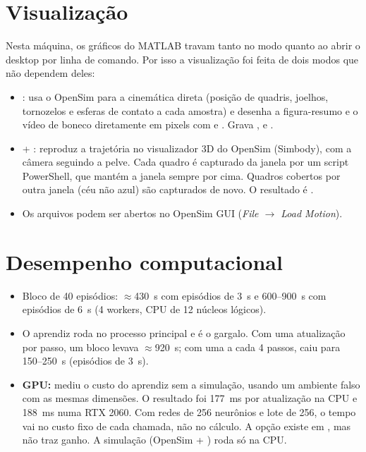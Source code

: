 \documentclass[11pt,a4paper]{article}
\begin{document}
\section{Visualização}
Nesta máquina, os gráficos do MATLAB travam tanto no modo  quanto ao abrir o desktop por linha
de comando. Por isso a visualização foi feita de dois modos que não dependem deles:
\begin{itemize}
  \item {}: usa o OpenSim para a cinemática direta (posição de quadris, joelhos,
        tornozelos e esferas de contato a cada amostra) e desenha a figura-resumo e o vídeo de boneco
        diretamente em pixels com  e . Grava ,
         e .
  \item {} + : reproduz a trajetória no visualizador 3D do
        OpenSim (Simbody), com a câmera seguindo a pelve. Cada quadro é capturado da janela por um script
        PowerShell, que mantém a janela sempre por cima. Quadros cobertos por outra janela (céu não azul)
        são capturados de novo. O resultado é .
  \item Os arquivos  podem ser abertos no OpenSim GUI (\emph{File $\to$ Load Motion}).
\end{itemize}

\section{Desempenho computacional}
\begin{itemize}
  \item Bloco de 40 episódios: $\approx$430~s com episódios de 3~s e 600--900~s com episódios de 6~s
        (4 workers, CPU de 12 núcleos lógicos).
  \item O aprendiz roda no processo principal e é o gargalo. Com uma atualização por passo, um bloco levava
        $\approx$920~s; com uma a cada 4 passos, caiu para 150--250~s (episódios de 3~s).
  \item \textbf{GPU:}  mediu o custo do aprendiz sem a simulação, usando um ambiente
        falso com as mesmas dimensões. O resultado foi 177~ms por atualização na CPU e 188~ms numa RTX 2060.
        Com redes de 256 neurônios e lote de 256, o tempo vai no custo fixo de cada chamada, não no cálculo.
        A opção  existe em , mas não traz ganho. A simulação
        (OpenSim + ) roda só na CPU.
\end{itemize}
\end{document}
